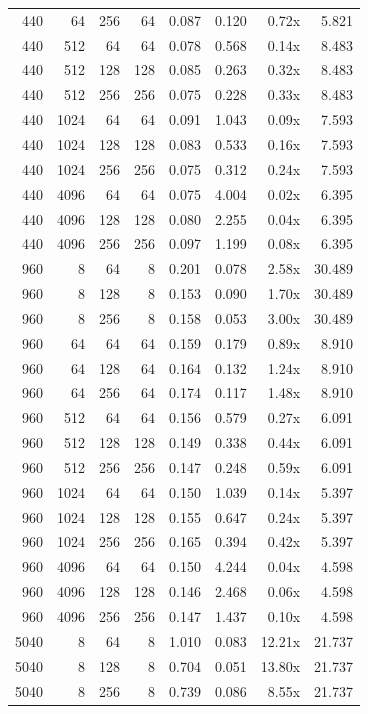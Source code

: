 {\begin{longtable}{rrrrrrrr}
440 & 64 & 256 & 64 & 0.087 & 0.120 & 0.72x & 5.821\\
440 & 512 & 64 & 64 & 0.078 & 0.568 & 0.14x & 8.483\\
440 & 512 & 128 & 128 & 0.085 & 0.263 & 0.32x & 8.483\\
440 & 512 & 256 & 256 & 0.075 & 0.228 & 0.33x & 8.483\\
440 & 1024 & 64 & 64 & 0.091 & 1.043 & 0.09x & 7.593\\
440 & 1024 & 128 & 128 & 0.083 & 0.533 & 0.16x & 7.593\\
440 & 1024 & 256 & 256 & 0.075 & 0.312 & 0.24x & 7.593\\
440 & 4096 & 64 & 64 & 0.075 & 4.004 & 0.02x & 6.395\\
440 & 4096 & 128 & 128 & 0.080 & 2.255 & 0.04x & 6.395\\
440 & 4096 & 256 & 256 & 0.097 & 1.199 & 0.08x & 6.395\\
960 & 8 & 64 & 8 & 0.201 & 0.078 & 2.58x & 30.489\\
960 & 8 & 128 & 8 & 0.153 & 0.090 & 1.70x & 30.489\\
960 & 8 & 256 & 8 & 0.158 & 0.053 & 3.00x & 30.489\\
960 & 64 & 64 & 64 & 0.159 & 0.179 & 0.89x & 8.910\\
960 & 64 & 128 & 64 & 0.164 & 0.132 & 1.24x & 8.910\\
960 & 64 & 256 & 64 & 0.174 & 0.117 & 1.48x & 8.910\\
960 & 512 & 64 & 64 & 0.156 & 0.579 & 0.27x & 6.091\\
960 & 512 & 128 & 128 & 0.149 & 0.338 & 0.44x & 6.091\\
960 & 512 & 256 & 256 & 0.147 & 0.248 & 0.59x & 6.091\\
960 & 1024 & 64 & 64 & 0.150 & 1.039 & 0.14x & 5.397\\
960 & 1024 & 128 & 128 & 0.155 & 0.647 & 0.24x & 5.397\\
960 & 1024 & 256 & 256 & 0.165 & 0.394 & 0.42x & 5.397\\
960 & 4096 & 64 & 64 & 0.150 & 4.244 & 0.04x & 4.598\\
960 & 4096 & 128 & 128 & 0.146 & 2.468 & 0.06x & 4.598\\
960 & 4096 & 256 & 256 & 0.147 & 1.437 & 0.10x & 4.598\\
5040 & 8 & 64 & 8 & 1.010 & 0.083 & 12.21x & 21.737\\
5040 & 8 & 128 & 8 & 0.704 & 0.051 & 13.80x & 21.737\\
5040 & 8 & 256 & 8 & 0.739 & 0.086 & 8.55x & 21.737\\

\end{longtable}}
